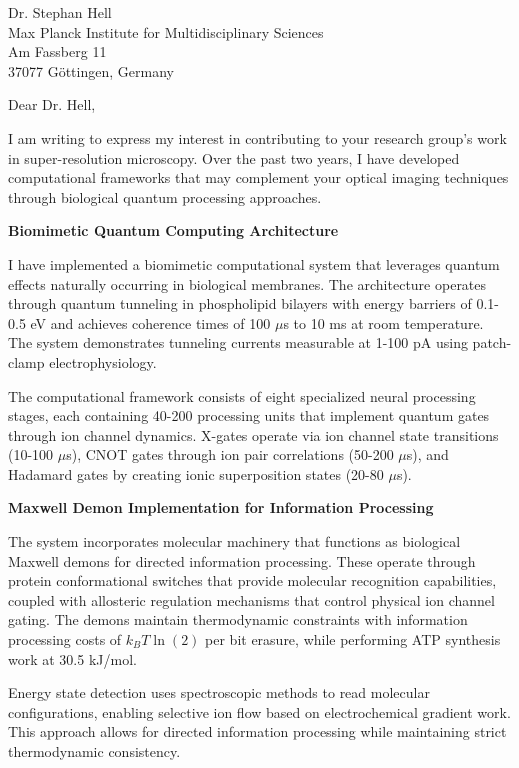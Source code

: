\documentclass[11pt,a4paper]{letter}
\begin{document}
\begin{letter}{Dr. Stephan Hell\\Max Planck Institute for Multidisciplinary Sciences\\Am Fassberg 11\\37077 G\"ottingen, Germany}

\opening{Dear Dr. Hell,}

I am writing to express my interest in contributing to your research group's work in super-resolution microscopy. Over the past two years, I have developed computational frameworks that may complement your optical imaging techniques through biological quantum processing approaches.

\textbf{Biomimetic Quantum Computing Architecture}

I have implemented a biomimetic computational system that leverages quantum effects naturally occurring in biological membranes. The architecture operates through quantum tunneling in phospholipid bilayers with energy barriers of 0.1-0.5 eV and achieves coherence times of 100 $\mu$s to 10 ms at room temperature. The system demonstrates tunneling currents measurable at 1-100 pA using patch-clamp electrophysiology.

The computational framework consists of eight specialized neural processing stages, each containing 40-200 processing units that implement quantum gates through ion channel dynamics. X-gates operate via ion channel state transitions (10-100 $\mu$s), CNOT gates through ion pair correlations (50-200 $\mu$s), and Hadamard gates by creating ionic superposition states (20-80 $\mu$s).

\textbf{Maxwell Demon Implementation for Information Processing}

The system incorporates molecular machinery that functions as biological Maxwell demons for directed information processing. These operate through protein conformational switches that provide molecular recognition capabilities, coupled with allosteric regulation mechanisms that control physical ion channel gating. The demons maintain thermodynamic constraints with information processing costs of $k_BT \ln(2)$ per bit erasure, while performing ATP synthesis work at 30.5 kJ/mol.

Energy state detection uses spectroscopic methods to read molecular configurations, enabling selective ion flow based on electrochemical gradient work. This approach allows for directed information processing while maintaining strict thermodynamic consistency.


\end{letter}
\end{document}
